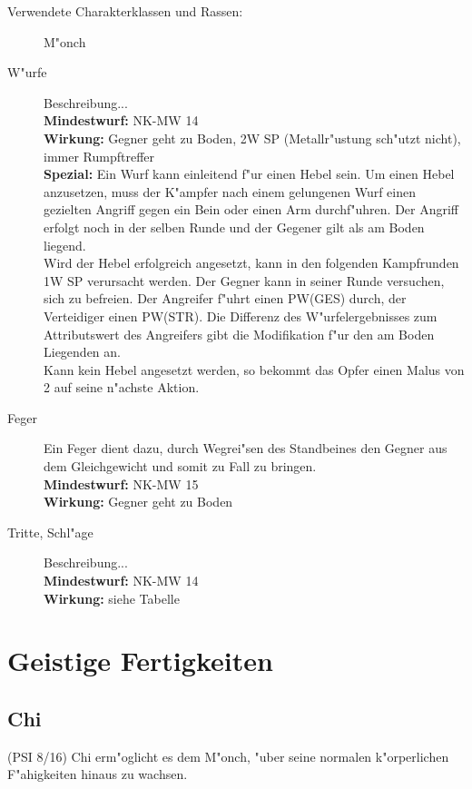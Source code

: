 \begin{description}
\item [Verwendete Charakterklassen und Rassen:] M"onch

\item [W"urfe] Beschreibung...\\
\textbf{Mindestwurf:} NK-MW 14\\
\textbf{Wirkung:} Gegner geht zu Boden, 2W SP (Metallr"ustung sch"utzt nicht), immer Rumpftreffer\\
\textbf{Spezial:} Ein Wurf kann einleitend f"ur einen Hebel sein. Um einen Hebel anzusetzen, muss der K"ampfer nach einem gelungenen Wurf einen gezielten Angriff gegen ein Bein oder einen Arm durchf"uhren. Der Angriff erfolgt noch in der selben Runde und der Gegener gilt als am Boden liegend.\\
Wird der Hebel erfolgreich angesetzt, kann in den folgenden Kampfrunden 1W SP verursacht werden. Der Gegner kann in seiner Runde versuchen, sich zu befreien. Der Angreifer f"uhrt einen PW(GES) durch, der Verteidiger einen PW(STR). Die Differenz des W"urfelergebnisses zum Attributswert des Angreifers gibt die Modifikation f"ur den am Boden Liegenden an.\\
Kann kein Hebel angesetzt werden, so bekommt das Opfer einen Malus von 2 auf seine n"achste Aktion.

\item [Feger] Ein Feger dient dazu, durch Wegrei"sen des Standbeines den Gegner aus dem Gleichgewicht und somit zu Fall zu bringen.\\
\textbf{Mindestwurf:} NK-MW 15\\
\textbf{Wirkung:} Gegner geht zu Boden

\item [Tritte, Schl"age] Beschreibung...\\
\textbf{Mindestwurf:} NK-MW 14\\
\textbf{Wirkung:} siehe Tabelle

\end{description}

\section{Geistige Fertigkeiten}
\subsection{Chi}
\par (PSI 8/16) Chi erm"oglicht es dem M"onch, "uber seine normalen k"orperlichen F"ahigkeiten hinaus zu wachsen.

